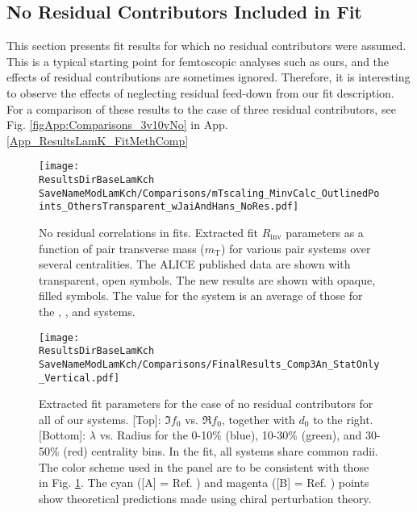 \documentclass[/home/jesse/Analysis/FemtoAnalysis/AnalysisNotes/AnalysisNoteJBuxton.tex]{subfiles}
\renewcommand{\NonFlatBgdLamKch}{_NonFlatBgdCrctnLamK0LinearLamKchPolynomial}
\renewcommand{\ResNum}{_NoRes}
\renewcommand{\PrimMaxDecay}{}
\renewcommand{\ResMethod}{}
\renewcommand{\SaveNameModLamKch}{\MomRes\NonFlatBgdLamKch\ResNum\PrimMaxDecay\ResMethod\ParamFixAndShareLamKch}
\begin{document}
\subsection{No Residual Contributors Included in Fit}
\label{App_ResultsLamK_NoRes}

This section presents fit results for which no residual contributors were assumed.
This is a typical starting point for femtoscopic analyses such as ours, and the effects of residual contributions are sometimes ignored.
Therefore, it is interesting to observe the effects of neglecting residual feed-down from our fit description.
For a comparison of these results to the case of three residual contributors, see Fig. \ref{figApp:Comparisons_3v10vNo} in App. \ref{App_ResultsLamK_FitMethComp}

\begin{figure}[h]
  \centering
  \texttt{[image: \\ResultsDirBaseLamKch\\SaveNameModLamKch/Comparisons/mTscaling\_MinvCalc\_OutlinedPoints\_OthersTransparent\_wJaiAndHans\_NoRes.pdf]}
  \caption[$m_{\mathrm{T}}$ scaling of radii: No residuals]
  {
  No residual correlations in \LamK fits.  
  Extracted fit $R_{\mathrm{inv}}$ parameters as a function of pair transverse mass ($m_{\mathrm{T}}$) for various pair systems over several centralities. 
  The ALICE published data \cite{Adam:2015vja} are shown with transparent, open symbols.  
  The new \LamK results are shown with opaque, filled symbols.  
  The \mt value for the \LamK system is an average of those for the \LamKchP, \ALamKchM, and \LamKs systems.
  }
  \label{figApp:mTScalingOfRadii_NoRes}
\end{figure}

\begin{figure}[h]
  \centering
  \texttt{[image: \\ResultsDirBaseLamKch\\SaveNameModLamKch/Comparisons/FinalResults\_Comp3An\_StatOnly\_Vertical.pdf]}
  \caption[Extracted scattering parameters: No residuals]
  {
  Extracted fit parameters for the case of no residual contributors for all of our \LamK systems.  
  [Top]: $\Im f_{0}$ vs. $\Re f_{0}$, together with $d_{0}$ to the right.  
  [Bottom]: $\lambda$ vs. Radius for the 0-10\% (blue), 10-30\% (green), and 30-50\% (red) centrality bins.  
  In the fit, all \LamK systems share common radii.
  The color scheme used in the panel are to be consistent with those in Fig. \ref{figApp:mTScalingOfRadii_NoRes}.
  The cyan ([A] = Ref. \cite{Liu:2006xja}) and magenta ([B] = Ref. \cite{Mai:2009ce}) points show theoretical predictions made using chiral perturbation theory.
  }
  \label{figApp:ScattParams_NoRes}
\end{figure}
\end{document}
